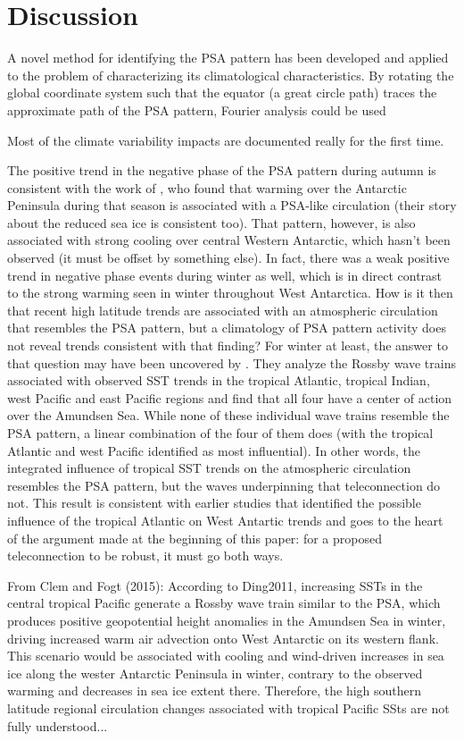 \section{Discussion}

A novel method for identifying the PSA pattern has been developed and applied to the problem of characterizing its climatological characteristics. By rotating the global coordinate system such that the equator (a great circle path) traces the approximate path of the PSA pattern, Fourier analysis could be used   


Most of the climate variability impacts are documented really for the first time.

The positive trend in the negative phase of the PSA pattern during autumn is consistent with the work of \citet{Ding2013}, who found that warming over the Antarctic Peninsula during that season is associated with a PSA-like circulation (their story about the reduced sea ice is consistent too). That pattern, however, is also associated with strong cooling over central Western Antarctic, which hasn't been observed (it must be offset by something else). In fact, there was a weak positive trend in negative phase events during winter as well, which is in direct contrast to the strong warming seen in winter throughout West Antarctica. How is it then that recent high latitude trends are associated with an atmospheric circulation that resembles the PSA pattern, but a climatology of PSA pattern activity does not reveal trends consistent with that finding? For winter at least, the answer to that question may have been uncovered by \citet{Li2015a}. They analyze the Rossby wave trains associated with observed SST trends in the tropical Atlantic, tropical Indian, west Pacific and east Pacific regions and find that all four have a center of action over the Amundsen Sea. While none of these individual wave trains resemble the PSA pattern, a linear combination of the four of them does (with the tropical Atlantic and west Pacific identified as most influential). In other words, the integrated influence of tropical SST trends on the atmospheric circulation resembles the PSA pattern, but the waves underpinning that teleconnection do not. This result is consistent with earlier studies that identified the possible influence of the tropical Atlantic on West Antartic trends \citep{Li2014,Simpkins2014} and goes to the heart of the argument made at the beginning of this paper: for a proposed teleconnection to be robust, it must go both ways. 

From Clem and Fogt (2015): According to Ding2011, increasing SSTs in the central tropical Pacific generate a Rossby wave train similar to the PSA, which produces positive geopotential height anomalies in the Amundsen Sea in winter, driving increased warm air advection onto West Antarctic on its western flank. This scenario would be associated with cooling and wind-driven increases in sea ice along the wester Antarctic Peninsula in winter, contrary to the observed warming and decreases in sea ice extent there. Therefore, the high southern latitude regional circulation changes associated with tropical Pacific SSts are not fully understood...

